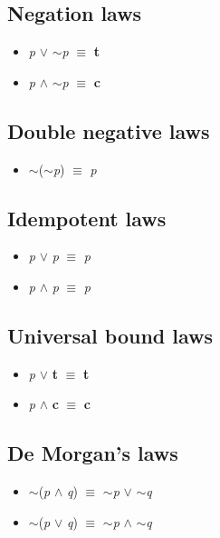 \documentclass{article}
\begin{document}
\subsection{Negation laws}
\begin{itemize}
\item \textit{p} $\lor$ $\sim$\textit{p} $\equiv$ \textbf{t}
\item \textit{p} $\wedge$ $\sim$\textit{p} $\equiv$ \textbf{c}
\end{itemize}

\subsection{Double negative laws}
\begin{itemize}
\item $\sim$($\sim$\textit{p}) $\equiv$ \textit{p}
\end{itemize}

\subsection{Idempotent laws}
\begin{itemize}
\item \textit{p} $\lor$ \textit{p} $\equiv$ \textit{p}
\item \textit{p} $\wedge$ \textit{p} $\equiv$ \textit{p}
\end{itemize}

\subsection{Universal bound laws}
\begin{itemize}
\item \textit{p} $\lor$ \textbf{t} $\equiv$ \textbf{t}
\item \textit{p} $\wedge$ \textbf{c} $\equiv$ \textbf{c}
\end{itemize}

\subsection{De Morgan's laws}
\begin{itemize}
\item $\sim$(\textit{p} $\wedge$ \textit{q}) $\equiv$ $\sim$\textit{p} $\lor$ $\sim$\textit{q}
\item $\sim$(\textit{p} $\lor$ \textit{q}) $\equiv$ $\sim$\textit{p} $\wedge$ $\sim$\textit{q}
\end{itemize}
\end{document}
